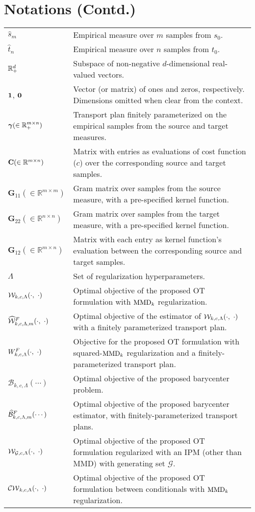 \section*{Notations (Contd.)}
\vspace{0.25in}
\begin{tabular}{@{}l  p{125mm}@{}}
$\hat{s}_m$ & Empirical measure over $m$ samples from $s_0$.\\
$\hat{t}_n$ & Empirical measure over $n$ samples from $t_0$.\\
$\mathbb{R}^d_+$ & Subspace of non-negative $d$-dimensional real-valued vectors.\\
$\mathbf{1}$, $\mathbf{0}$ & Vector (or matrix) of ones and zeros, respectively. Dimensions omitted when clear from the context.\\
$\bm{\gamma} (\in \mathbb{R}_+^{m\times n}) $ & Transport plan finitely parameterized on the empirical samples from the source and target measures.\\
$\mathbf{C} (\in \mathbb{R}^{m\times n})$ & Matrix with entries as evaluations of cost function ($c$) over the corresponding source and target samples.\\
$\mathbf{G}_{11}(\in \mathbb{R}^{m\times m})$ & Gram matrix over samples from the source measure, with a pre-specified kernel function.\\
$\mathbf{G}_{22}(\in \mathbb{R}^{n\times n})$ & Gram matrix over samples from the target measure,
 with a pre-specified kernel function.\\
$\mathbf{G}_{12} (\in \mathbb{R}^{m\times n})$ &  Matrix with each entry as kernel function's evaluation between the corresponding source and target samples.\\
$\Lambda$ & Set of regularization hyperparameters.\\
$\calU(\cdot, \ \cdot)$ & Optimal objective of the proposed OT formulation with $\textup{MMD}_k$ regularization.\\
$\widehat{\mathcal{W}}^F_{k, c, \Lambda, m}(\cdot, \ \cdot)$ & Optimal objective of the estimator of $\calU(\cdot, \ \cdot)$ with a finitely parameterized transport plan.\\
$\calWF(\cdot, \ \cdot)$ & Objective for the proposed OT formulation with squared-$\textup{MMD}_k$ regularization and a finitely-parameterized transport plan.\\
$\mathcal{B}_{k, c, \Lambda}(\cdots)$ & Optimal objective of the proposed barycenter problem.\\
$\widehat{\mathcal{B}}^F_{k,c,\Lambda, m}(\cdots)$ & Optimal objective of the proposed barycenter estimator, with finitely-parameterized transport plans.\\
$\calWI(\cdot, \ \cdot)$ & Optimal objective of the proposed OT formulation regularized with an IPM (other than MMD) with generating set $\mathcal{G}$.\\
$\calCW(\cdot, \ \cdot)$ & Optimal objective of the proposed OT formulation between conditionals with $\textup{MMD}_k$ regularization.
\end{tabular}
\setlength{\tabcolsep}{2pt}